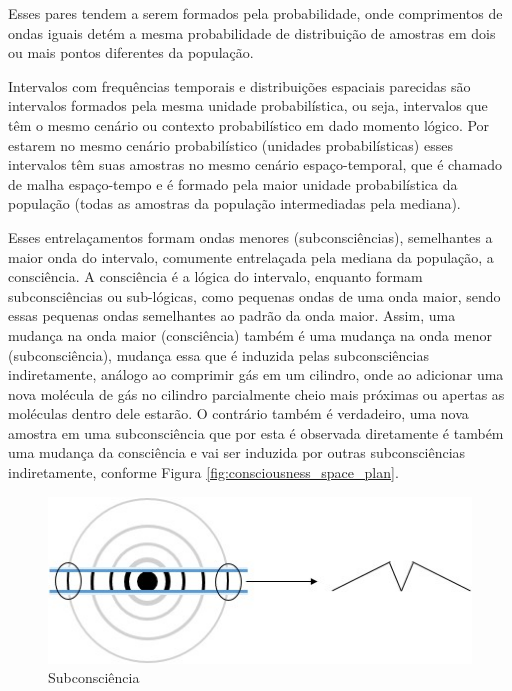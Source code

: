 Esses pares tendem a serem formados pela probabilidade, onde comprimentos de ondas iguais detém a mesma probabilidade de distribuição de amostras em dois ou mais pontos diferentes da população. 

Intervalos com frequências temporais e distribuições espaciais parecidas são intervalos formados pela mesma unidade probabilística, ou seja, intervalos que têm o mesmo cenário ou contexto probabilístico em dado momento lógico. Por estarem no mesmo cenário probabilístico (unidades probabilísticas) esses intervalos têm suas amostras no mesmo cenário espaço-temporal, que é chamado de malha espaço-tempo e é formado pela maior unidade probabilística da população (todas as amostras da população intermediadas pela mediana). 

Esses entrelaçamentos formam ondas menores (subconsciências), semelhantes a maior onda do intervalo, comumente entrelaçada pela mediana da população, a consciência. A consciência é a lógica do intervalo, enquanto formam subconsciências ou sub-lógicas, como pequenas ondas de uma onda maior, sendo essas pequenas ondas semelhantes ao padrão da onda maior. Assim, uma mudança na onda maior (consciência) também é uma mudança na onda menor (subconsciência), mudança essa que é induzida pelas subconsciências indiretamente, análogo ao comprimir gás em um cilindro, onde ao adicionar uma nova molécula de gás no cilindro parcialmente cheio mais próximas ou apertas as moléculas dentro dele estarão. O contrário também é verdadeiro, uma nova amostra em uma subconsciência que por esta é observada diretamente é também uma mudança da consciência e vai ser induzida por outras subconsciências indiretamente, conforme Figura \ref{fig:consciousness_space_plan}.
	\begin{figure}[H]
	\caption{Subconsciência}
	\label{fig:consciousness_subconscious}
	\centering
	\includegraphics[scale=.8]{sections/images/consciousness_subconscious.jpg}
	\end{figure}
	
